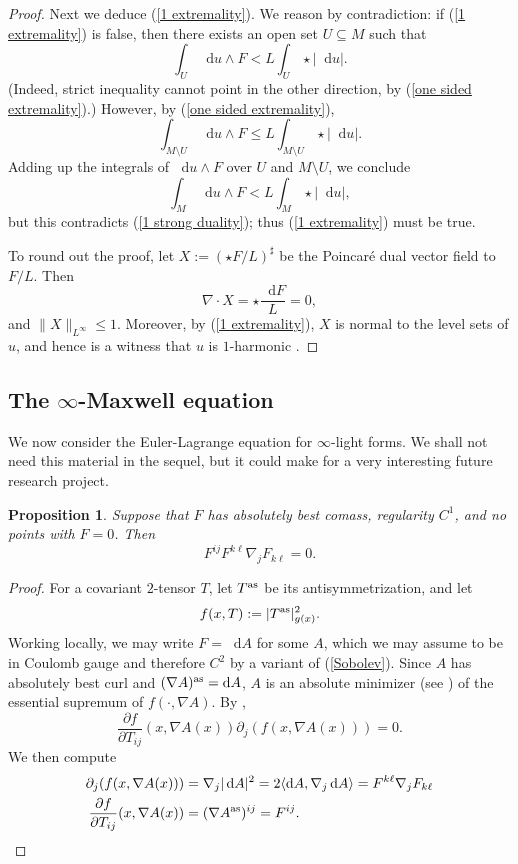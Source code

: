 \documentclass[reqno,11pt]{amsart}
\newcommand*\dif{\mathop{}\!\mathrm{d}}
\newtheorem{proposition}[theorem]{Proposition}
\theoremstyle{definition}
\numberwithin{equation}{section}
\begin{document}
\begin{proof}
Next we deduce (\ref{1 extremality}).
We reason by contradiction: if (\ref{1 extremality}) is false, then there exists an open set $U \subseteq M$ such that 
$$\int_U \dif u \wedge F < L \int_U \star |\dif u|.$$
(Indeed, strict inequality cannot point in the other direction, by (\ref{one sided extremality}).)
However, by (\ref{one sided extremality}), 
$$\int_{M \setminus U} \dif u \wedge F \leq L \int_{M \setminus U} \star |\dif u|.$$
Adding up the integrals of $\dif u \wedge F$ over $U$ and $M \setminus U$, we conclude 
$$\int_M \dif u \wedge F < L \int_M \star |\dif u|,$$
but this contradicts (\ref{1 strong duality}); thus (\ref{1 extremality}) must be true.

To round out the proof, let $X := (\star F/L)^\sharp$ be the Poincar\'e dual vector field to $F/L$. Then
$$\nabla \cdot X = \star \frac{\dif F}{L} = 0,$$
and $\|X\|_{L^\infty} \leq 1$.
Moreover, by (\ref{1 extremality}), $X$ is normal to the level sets of $u$, and hence is a witness that $u$ is $1$-harmonic \cite{Mazon14}.
\end{proof}

\subsection{The \texorpdfstring{$\infty$-Maxwell equation}{infinity-Maxwell equation}}
We now consider the Euler-Lagrange equation for $\infty$-light forms.
We shall not need this material in the sequel, but it could make for a very interesting future research project.

\begin{proposition}
Suppose that $F$ has absolutely best comass, regularity $C^1$, and no points with $F = 0$. Then
\begin{equation}\label{infinityMaxwell}
	F^{ij} F^{k\ell} \nabla_j F_{k \ell} = 0.
\end{equation}
\end{proposition}
\begin{proof}
For a covariant $2$-tensor $T$, let $T^{\rm as}$ be its antisymmetrization, and let
$$f(x, T) := |T^{\rm as}|_{g(x)}^2.$$
Working locally, we may write $F = \dif A$ for some $A$, which we may assume to be in Coulomb gauge and therefore $C^2$ by a variant of (\ref{Sobolev}).
Since $A$ has absolutely best curl and $(\nabla A)^{\rm as} = \dif A$, $A$ is an absolute minimizer (see \cite[Definition 5.1]{Barron2001}) of the essential supremum of $f(\cdot, \nabla A)$.
By \cite[Theorem 5.2]{Barron2001},
\begin{equation}\label{ELA}
	\frac{\partial f}{\partial T_{ij}}(x, \nabla A(x)) \partial_j (f(x, \nabla A(x))) = 0.
\end{equation}
We then compute
\begin{align*}
\partial_j (f(x, \nabla A(x))) &= \nabla_j |\dif A|^2 = 2 \langle \dif A, \nabla_j \dif A\rangle = F^{k\ell} \nabla_j F_{k\ell} \\
\frac{\partial f}{\partial T_{ij}}(x, \nabla A(x)) &= (\nabla A^{\rm as})^{ij} = F^{ij}. \qedhere
\end{align*}
\end{proof}
\end{document}
